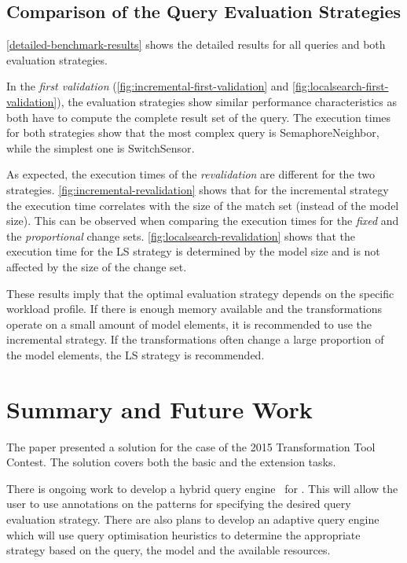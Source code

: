 \documentclass[submission,copyright,creativecommons]{eptcs}
\begin{document}
\subsection{Comparison of the Query Evaluation Strategies}

\autoref{detailed-benchmark-results} shows the detailed results for all queries and both evaluation strategies.

In the \emph{first validation} (\autoref{fig:incremental-first-validation} and \autoref{fig:localsearch-first-validation}), the evaluation strategies show similar performance characteristics as both have to compute the complete result set of the query. The execution times for both strategies show that the most complex query is \textsf{SemaphoreNeighbor}, while the simplest one is \textsf{SwitchSensor}. 

As expected, the execution times of the \emph{revalidation} are different for the two strategies. \autoref{fig:incremental-revalidation} shows that for the incremental strategy the execution time correlates with the size of the match set (instead of the model size). This can be observed when comparing the execution times for the \emph{fixed} and the \emph{proportional} change sets. \autoref{fig:localsearch-revalidation} shows that the execution time for the LS strategy is determined by the model size and is not affected by the size of the change set.

These results imply that the optimal evaluation strategy depends on the specific workload profile. If there is enough memory available and the transformations operate on a small amount of model elements, it is recommended to use the incremental strategy. If the transformations often change a large proportion of the model elements, the LS strategy is recommended.

\section{Summary and Future Work}
\label{summary}

The paper presented a solution for the \tb case of the 2015 Transformation Tool Contest. The solution covers both the basic and the extension tasks.

There is ongoing work to develop a hybrid query engine~\cite{STTT10} for \eiq. This will allow the user to use annotations on the patterns for specifying the desired query evaluation strategy. There are also plans to develop an adaptive query engine which will use query optimisation heuristics to determine the appropriate strategy based on the query, the model and the available resources.
\end{document}
